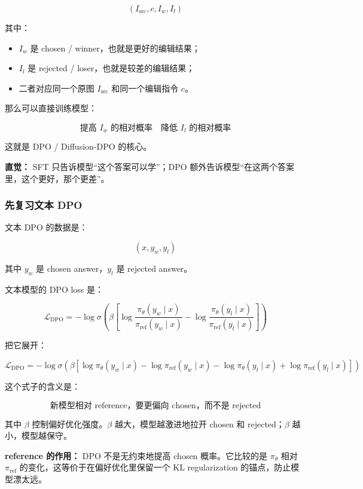 \[
(I_\text{src},c,I_w,I_l)
\]

其中：

\begin{itemize}[leftmargin=1.5em]
  \item $I_w$ 是 chosen / winner，也就是更好的编辑结果；
  \item $I_l$ 是 rejected / loser，也就是较差的编辑结果；
  \item 二者对应同一个原图 $I_\text{src}$ 和同一个编辑指令 $c$。
\end{itemize}

那么可以直接训练模型：

\[
\text{提高 } I_w \text{ 的相对概率}
\quad
\text{降低 } I_l \text{ 的相对概率}
\]

这就是 DPO / Diffusion-DPO 的核心。

\begin{intubox}
\textbf{直觉：} SFT 只告诉模型“这个答案可以学”；DPO 额外告诉模型“在这两个答案里，这个更好，那个更差”。
\end{intubox}

\subsubsection{先复习文本 DPO}

文本 DPO 的数据是：

\[
(x,y_w,y_l)
\]

其中 $y_w$ 是 chosen answer，$y_l$ 是 rejected answer。

文本模型的 DPO loss 是：

\[
\mathcal{L}_\text{DPO}
=
-
\log
\sigma
\left(
\beta
\left[
\log\frac{\pi_\theta(y_w\mid x)}{\pi_\text{ref}(y_w\mid x)}
-
\log\frac{\pi_\theta(y_l\mid x)}{\pi_\text{ref}(y_l\mid x)}
\right]
\right)
\]

把它展开：

\[
\mathcal{L}_\text{DPO}
=
-
\log
\sigma
\left(
\beta
\left[
\log \pi_\theta(y_w\mid x)
-
\log \pi_\text{ref}(y_w\mid x)
-
\log \pi_\theta(y_l\mid x)
+
\log \pi_\text{ref}(y_l\mid x)
\right]
\right)
\]

这个式子的含义是：

\[
\text{新模型相对 reference，要更偏向 chosen，而不是 rejected}
\]

其中 $\beta$ 控制偏好优化强度。$\beta$ 越大，模型越激进地拉开 chosen 和 rejected；$\beta$ 越小，模型越保守。

\begin{warnbox}
\textbf{reference 的作用：} DPO 不是无约束地提高 chosen 概率。它比较的是 $\pi_\theta$ 相对 $\pi_\text{ref}$ 的变化，这等价于在偏好优化里保留一个 KL regularization 的锚点，防止模型漂太远。
\end{warnbox}


